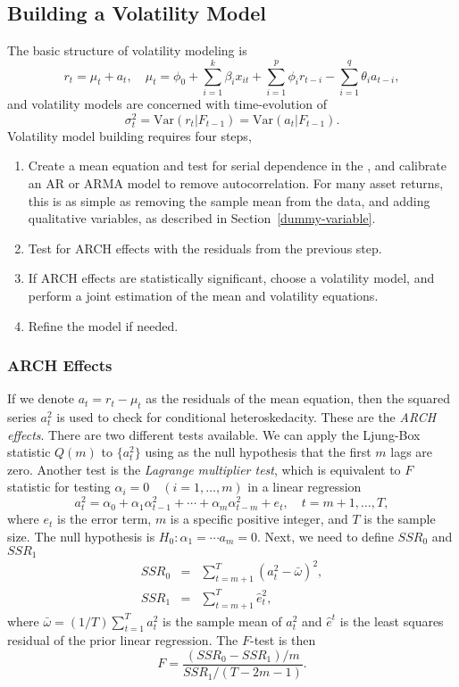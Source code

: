 \subsection{Building a Volatility Model}
The basic structure of volatility modeling is
\[
r_t = \mu_t + a_t, \quad \mu_t = \phi_0 + \sum^k_{i=1}\beta_i x_{it} + \sum^p_{i=1}\phi_i r_{t-i}
- \sum^q_{i=1}\theta_i a_{t-i},
\]
and volatility models are concerned with time-evolution of
\[
\sigma^2_t = \text{Var} \left(r_t | F_{t-1} \right) = \text{Var} \left(a_t | F_{t-1} \right).
\]
Volatility model building requires four steps,
\begin{enumerate}
\item Create a mean equation and test for serial dependence in the \fts{}, and calibrate an AR or ARMA model to remove autocorrelation. For many asset returns, this is as simple as removing the sample mean from the data, and adding qualitative variables, as described in Section~\ref{dummy-variable}.
\item Test for ARCH effects with the residuals from the previous step.
\item If ARCH effects are statistically significant, choose a volatility model, and perform a joint estimation of the mean and volatility equations.
\item Refine the model if needed.
\end{enumerate}

\subsubsection{ARCH Effects}
If we denote $a_t = r_t - \mu_t$ as the residuals of the mean equation, then the squared series $a^2_t$ is used to check for conditional heteroskedacity. These are the \emph{ARCH effects}. There are two different tests available. We can apply the Ljung-Box statistic $Q(m)$ to  $\{a^2_t\}$ using as the null hypothesis that the first $m$ lags are zero. Another test is the \emph{Lagrange multiplier test}, which is equivalent to $F$ statistic for testing $\alpha_i=0 \quad (i=1,\ldots,m)$ in a linear regression
\[
a^2_t = \alpha_0 +\alpha_1 \alpha^2_{t-1}+\cdots+\alpha_m\alpha^2_{t-m}+e_t, \quad 
t=m+1,\ldots,T,
\]
where $e_t$ is the error term, $m$ is a specific positive integer, and $T$ is the sample size. The null hypothesis is $H_0: \alpha_1= \cdots a_m = 0$. Next, we need to define $SSR_0$ and $SSR_1$
\begin{eqnarray*}
SSR_0 &=& \sum^T_{t=m+1} (a^2_t - \bar{\omega})^2, \\
SSR_1 &=& \sum^T_{t=m+1} \hat{e}^2_t, 
\end{eqnarray*}
where $\bar{\omega}=(1/T)\sum^T_{t=1}a^2_t$ is the sample mean of $a^2_t$ and  $\hat{e}^t$ is the least squares residual of the prior linear regression. The $F$-test is then
\[
F=\frac{(SSR_0-SSR_1)/m}{SSR_1/(T-2m-1)}.
\]

